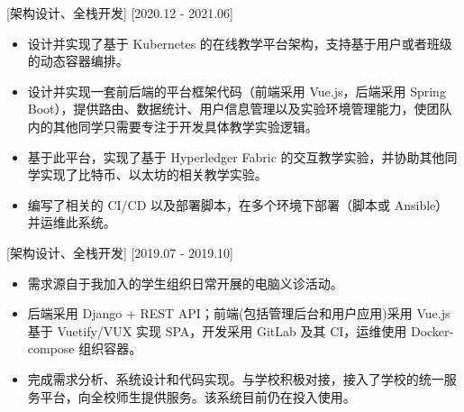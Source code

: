 \documentclass{resume}
\begin{document}
[架构设计、全栈开发]
[2020.12 - 2021.06] 

\begin{itemize}
  \item 设计并实现了基于 Kubernetes 的在线教学平台架构，支持基于用户或者班级的动态容器编排。
  \item 设计并实现一套前后端的平台框架代码（前端采用 Vue.js，后端采用 Spring Boot），提供路由、数据统计、用户信息管理以及实验环境管理能力，使团队内的其他同学只需要专注于开发具体教学实验逻辑。
  \item 基于此平台，实现了基于 Hyperledger Fabric 的交互教学实验，并协助其他同学实现了比特币、以太坊的相关教学实验。
  \item 编写了相关的 CI/CD 以及部署脚本，在多个环境下部署（脚本或 Ansible）并运维此系统。
\end{itemize}

[架构设计、全栈开发]
[2019.07 - 2019.10] 

\begin{itemize}
  \item 需求源自于我加入的学生组织日常开展的电脑义诊活动。
  \item 后端采用 Django + REST API；前端(包括管理后台和用户应用)采用 Vue.js 基于 Vuetify/VUX 实现 SPA，开发采用 GitLab 及其 CI，运维使用 Docker-compose 组织容器。
  \item 完成需求分析、系统设计和代码实现。与学校积极对接，接入了学校的统一服务平台，向全校师生提供服务。该系统目前仍在投入使用。
\end{itemize}
\end{document}
